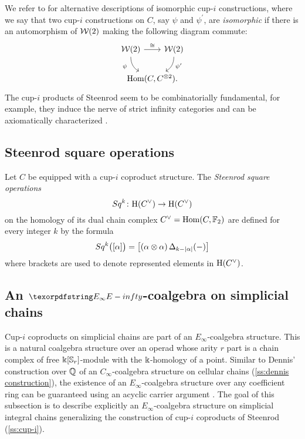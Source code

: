 We refer to \cite{mcclure2003multivariable, gonzalez-diaz1999steenrod, medina2021fast_sq} for alternative descriptions of isomorphic \mbox{cup-$i$} constructions, where we say that two \mbox{cup-$i$} constructions on $C$, say $\psi$ and $\psi^\prime$, are \textit{isomorphic} if there is an automorphism of $\mathcal{W}(2)$ making the following diagram commute:
\[
\begin{tikzcd} [column sep = -25, row sep=normal]
\cW(2) \arrow[rr, "\cong"] \arrow[rd, in=150, out=-90, "\psi^{\phantom{\prime}}"', near start] & & \cW(2) \arrow[ld, in=30, out=-90, "\psi^\prime", near start] \\
& \Hom(C, C^{\ot 2}). &
\end{tikzcd}
\]
The cup-$i$ products of Steenrod seem to be combinatorially fundamental, for example, they induce the nerve of strict infinity categories \cite{street1987orientals, medina2020globular} and can be axiomatically characterized \cite{medina2022axiomatic}.

\subsection{Steenrod square operations} \label{ss:steenrod squares}

Let $C$ be equipped with a cup-$i$ coproduct structure.
The \textit{Steenrod square operations}
\[
Sq^k \colon \mathrm{H}(C^\vee) \to \mathrm{H}(C^\vee)
\]
on the homology of its dual chain complex $C^\vee = \mathrm{Hom}(C, {\mathbb{F}_2})$ are defined for every integer $k$ by the formula
\begin{equation} \label{e:steenrod squares}
Sq^k \big( [\alpha] \big) = \big[ (\alpha \otimes \alpha) \operatorname{\Delta}_{k - \lvert\alpha\rvert}(-) \big]
\end{equation}
where brackets are used to denote represented elements in $\mathrm{H}(C^\vee)$.


\subsection{An $\pdfEinfty$-coalgebra on simplicial chains} \label{ss:e-infty generalization}

Cup-$i$ coproducts on simplicial chains are part of an $E_\infty$-coalgebra structure.
This is a natural coalgebra structure over an operad whose arity $r$ part is a chain complex of free $\Bbbk[\mathbb{S}_r]$-module with the $\Bbbk$-homology of a point.
Similar to Dennis' construction over $\mathbb{Q}$ of an $C_\infty$-coalgebra structure on cellular chains (\cref{ss:dennis construction}), the existence of an $E_\infty$-coalgebra structure over any coefficient ring can be guaranteed using an acyclic carrier argument \cite{eilenberg1953acyclic}.
The goal of this subsection is to describe explicitly an $E_\infty$-coalgebra structure on simplicial integral chains generalizing the construction of cup-$i$ coproducts of Steenrod (\cref{ss:cup-i}).

